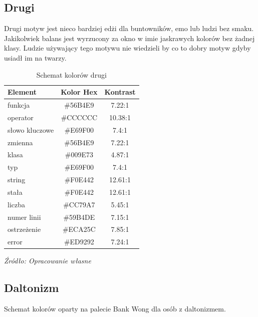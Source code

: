 \subsection{Drugi}
Drugi motyw jest nieco bardziej edżi dla buntowników, emo lub ludzi bez smaku. Jakikolwiek balans jest wyrzucony za okno w imie jaskrawych kolorów bez żadnej klasy. Ludzie używający tego motywu nie wiedzieli by co to dobry motyw gdyby usiadł im na twarzy.

\begin{table}[ht]
\centering
\caption{Schemat kolorów drugi}
\label{tab:alt1}
\begin{tabular}{|>{\raggedright\arraybackslash}p{4cm}|c|c|}
\hline
\textbf{Element} & \textbf{Kolor Hex} & \textbf{Kontrast} \\
\hline
funkcja       & \#56B4E9 & 7.22:1 \\
operator      & \#CCCCCC & 10.38:1 \\
słowo kluczowe & \#E69F00 & 7.4:1 \\
zmienna       & \#56B4E9 & 7.22:1 \\
klasa         & \#009E73 & 4.87:1 \\
typ           & \#E69F00 & 7.4:1 \\
string        & \#F0E442 & 12.61:1 \\
stała         & \#F0E442 & 12.61:1 \\
liczba        & \#CC79A7 & 5.45:1 \\
numer linii   & \#59B4DE & 7.15:1 \\
\hline
ostrzeżenie   & \#ECA25C & 7.85:1 \\
error         & \#ED9292 & 7.24:1 \\
\hline
\end{tabular}
\newline\newline
{\raggedright\fontsize{10pt}{12pt}\selectfont\textit{Źródło: Opracowanie własne}\par}
\end{table}

\subsection{Daltonizm}
Schemat kolorów oparty na palecie Bank Wong dla osób z daltonizmem.

